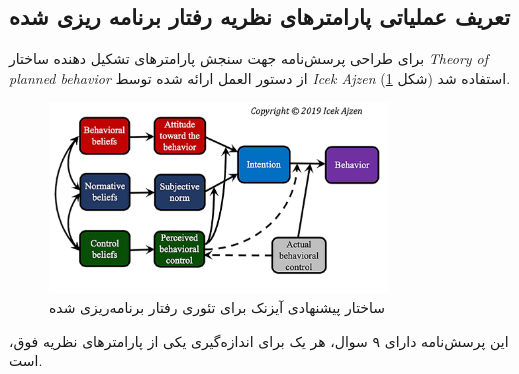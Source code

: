

\subsection{تعریف عملیاتی پارامترهای
     نظریه رفتار برنامه ریزی شده    
}

برای طراحی پرسش‌نامه جهت سنجش پارامتر‌های تشکیل دهنده ساختار
\textit{\gls{Theory of planned behavior}}
از دستور العمل ارائه شده توسط
\textit{\gls{Icek Ajzen}}
\!\citep{ajzenIcekAjzenHomepage}
استفاده شد
\citep{ajzenCONSTRUCTINGTHEORYPLANNEDa}(شکل \ref{fig:Theory_of_reasoned_action_AjzenAdvanced}).
\begin{figure}[htpb]
    \centering
    \includegraphics[width=0.8\textwidth]{./img/Theory_of_reasoned_action_AjzenAdvanced.png}
    \caption{ساختار پیشنهادی آیزنک برای تئوری رفتار برنامه‌ریزی شده}
    \label{fig:Theory_of_reasoned_action_AjzenAdvanced}
\end{figure}


 این پرسش‌نامه دارای ۹ سوال، هر یک برای اندازه‌گیری
یکی از پارامترهای نظریه فوق، است.

